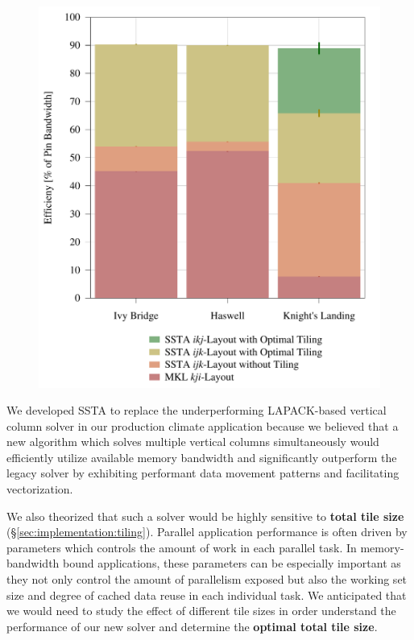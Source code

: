 \documentclass{sig-alternate-05-2015}
\begin{document}
\begin{figure}[!bth]
\begin{minipage}{0.49\textwidth}
    \includegraphics[width=0.95\columnwidth]{figures/post_tsb_impact_of_optimizations_histogram_09_03_2016_09_04_2016_1socket.pdf}
  \end{minipage}
\end{figure}

We developed SSTA to replace the underperforming LAPACK-based vertical column
  solver in our production climate application because we believed that a new
  algorithm which solves multiple vertical columns simultaneously would
  efficiently utilize available memory bandwidth and significantly outperform the
  legacy solver by exhibiting performant data movement patterns and facilitating
  vectorization.

We also theorized that such a solver would be highly sensitive to
  \textbf{total tile size} (\S\ref{sec:implementation:tiling}).
Parallel application performance is often driven by parameters which controls
  the amount of work in each parallel task.
In memory-bandwidth bound applications, these parameters can be especially important
  as they not only control the amount of parallelism exposed but also the working
  set size and degree of cached data reuse in each individual task.
We anticipated that we would need to study the effect of different tile sizes
  in order understand the performance of our new solver and determine the
  \textbf{optimal total tile size}.
\end{document}
